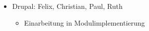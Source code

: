 \documentclass{swp}
\begin{document}
\\\\\\\\\\

\begin{itemize} 
\item Drupal: Felix, Christian, Paul, Ruth
\begin{itemize}
\item Einarbeitung in Modulimplementierung
\end{itemize}
\end{itemize}
\end{document}
